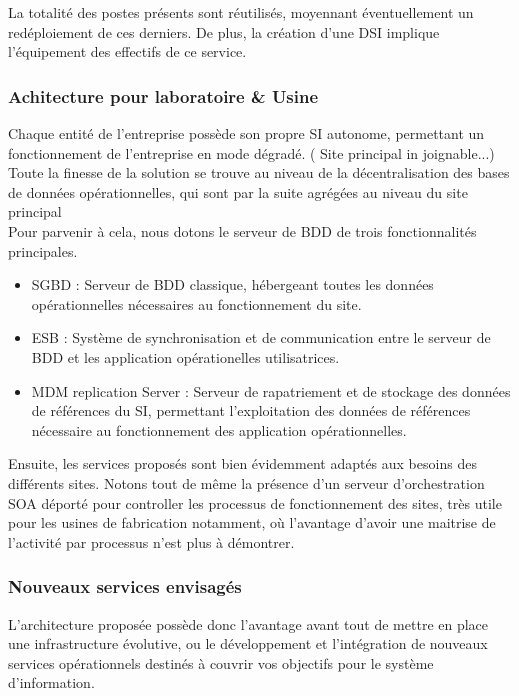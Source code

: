 La totalité des postes présents sont réutilisés, moyennant éventuellement un redéploiement de ces derniers. De plus, la création d'une DSI implique l'équipement des effectifs de ce service.

\subsubsection{Achitecture pour laboratoire \& Usine}

Chaque entité de l'entreprise possède son propre SI autonome, permettant un fonctionnement de l'entreprise en mode dégradé. ( Site principal in joignable...)
Toute la finesse de la solution se trouve au niveau de la décentralisation des bases de données opérationnelles, qui sont par la suite agrégées au niveau du site principal \\
Pour parvenir  à cela, nous dotons le serveur de BDD de trois fonctionnalités principales.
\begin{itemize}
\item SGBD : Serveur de BDD classique, hébergeant toutes les données opérationnelles nécessaires au fonctionnement du site.
\item ESB : Système de synchronisation et de communication entre le serveur de BDD et les application opérationelles utilisatrices.
\item MDM replication Server :  Serveur de rapatriement et de stockage des données de références du SI, permettant l'exploitation des données de références nécessaire au fonctionnement des application opérationnelles.
\end{itemize}

Ensuite, les services proposés sont bien évidemment adaptés aux besoins des différents sites. Notons tout de même la présence d'un serveur d'orchestration SOA déporté pour controller les processus de fonctionnement des sites, très utile pour les usines de fabrication notamment, où l'avantage d'avoir une maitrise de l'activité par processus n'est plus à démontrer.

\subsubsection{Nouveaux services envisagés}

L'architecture proposée possède donc l'avantage avant tout de mettre en place une infrastructure évolutive, ou le développement et l'intégration de nouveaux services opérationnels destinés à  couvrir vos objectifs pour le système d'information.

